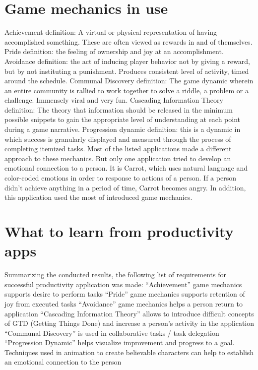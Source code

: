 \section{Game mechanics in use}

Achievement definition: A virtual or physical representation of having accomplished something. These are often viewed as rewards in and of themselves.
Pride definition: the feeling of ownership and joy at an accomplishment.
Avoidance definition:  the act of inducing player behavior not by giving a reward, but by not instituting a punishment. Produces consistent level of activity, timed around the schedule.
Communal Discovery definition: The game dynamic wherein an entire community is rallied to work together to solve a riddle, a problem or a challenge. Immensely viral and very fun.
Cascading Information Theory definition: The theory that information should be released in the minimum possible snippets to gain the appropriate level of understanding at each point during a game narrative.
Progression dynamic definition: this is a dynamic in which success is granularly displayed and measured through the process of completing itemized tasks.
Most of the listed applications made a different approach to these mechanics. But only one application tried to develop an emotional connection to a person. It is Carrot, which uses natural language and color-coded emotions in order to response to actions of a person. If a person didn’t achieve anything in a period of time, Carrot becomes angry. In addition, this application used the most of introduced game mechanics.

\section{What to learn from productivity apps}

Summarizing the conducted results, the following list of requirements for successful productivity application was made:
“Achievement” game mechanics supports desire to perform tasks
“Pride” game mechanics supports retention of joy from executed tasks
“Avoidance” game mechanics helps a person return to application
“Cascading Information Theory” allows to introduce difficult concepts of GTD (Getting Things Done) and increase a person’s activity in the application
“Communal Discovery” is used in collaborative tasks / task delegation
“Progression Dynamic” helps visualize improvement and progress to a goal.
Techniques used in animation to create believable characters can help to establish an emotional connection to the person
